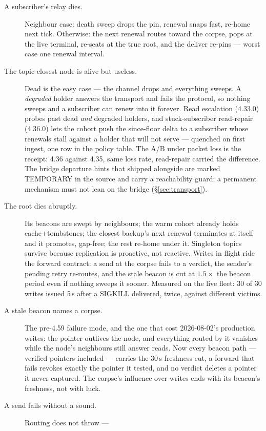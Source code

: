 \documentclass[nobib]{tufte-handout}
\begin{document}
\begin{description}
\item[A subscriber's relay dies.] Neighbour case: death sweep drops the
  pin, renewal snaps fast, re-home next tick. Otherwise: the next
  renewal routes toward the corpse, pops at the live terminal, re-seats
  at the true root, and the deliver re-pins --- worst case one renewal
  interval.
\item[The topic-closest node is alive but useless.] Dead is the easy
  case --- the channel drops and everything sweeps. A \emph{degraded}
  holder answers the transport and fails the protocol, so nothing
  sweeps and a subscriber can renew into it forever. Read escalation
  (4.33.0) probes past dead \emph{and} degraded holders, and
  stuck-subscriber read-repair (4.36.0) lets the cohort push the
  since-floor delta to a subscriber whose renewals stall against a
  holder that will not serve --- quenched on first ingest, one row in
  the policy table. The A/B under packet loss is the receipt: 4.36
  against 4.35, same loss rate, read-repair carried the difference.
  The bridge departure hints that shipped alongside are marked
  TEMPORARY in the source and carry a reachability guard; a permanent
  mechanism must not lean on the bridge (\S\ref{sec:transport}).
\item[The root dies abruptly.] Its beacons are swept by neighbours; the
  warm cohort already holds cache+tombstones; the closest backup's next
  renewal terminates at itself and it promotes, gap-free; the rest
  re-home under it. Singleton topics survive because replication is
  proactive, not reactive. Writes in flight ride the forward contract:
  a send at the corpse fails to a verdict, the sender's pending retry
  re-routes, and the stale beacon is cut at $1.5\times$ the beacon
  period even if nothing sweeps it sooner. Measured on the live fleet:
  30 of 30 writes issued 5\,s after a SIGKILL delivered, twice, against
  different victims.
\item[A stale beacon names a corpse.] The pre-4.59 failure mode, and
  the one that cost 2026-08-02's production writes: the pointer
  outlives the node, and everything routed by it vanishes while the
  node's neighbours still answer reads. Now every beacon path ---
  verified pointers included --- carries the 30\,s freshness cut, a
  forward that fails revokes exactly the pointer it tested, and no
  verdict deletes a pointer it never captured. The corpse's influence
  over writes ends with its beacon's freshness, not with luck.
\item[A send fails without a sound.] Routing does not throw ---

\end{description}
\end{document}

